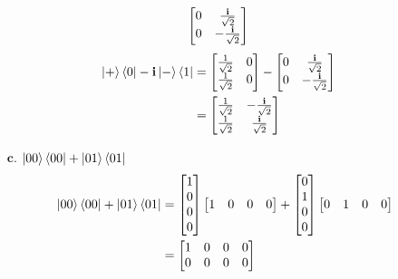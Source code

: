 \documentclass[11pt]{article}
\def\bfi{\ensuremath\textbf{i}}
\def\srtt{\ensuremath\frac{1}{\sqrt{2}}}
\begin{document}
\begin{enumerate}
\begin{align*}
\begin{bmatrix}
                    0 & \frac{\bfi}{\sqrt{2}} \\
                    0 & -\frac{\bfi}{\sqrt{2}} 
                \end{bmatrix}  & 
        \end{align*}
        \begin{align*}
            \ket{+}\bra{0} - \bfi\ket{-}\bra{1} 
            &= \begin{bmatrix} \srtt & 0 \\ \srtt & 0 \end{bmatrix}
                - \begin{bmatrix}
                    0 & \frac{\bfi}{\sqrt{2}} \\
                    0 & -\frac{\bfi}{\sqrt{2}} 
                \end{bmatrix} \\
                &= \begin{bmatrix}
                    \srtt & -\frac{\bfi}{\sqrt{2}} \\
                    \srtt & \frac{\bfi}{\sqrt{2}}
                \end{bmatrix} & 
        \end{align*}
    \item[$\textbf{c.}$] $\ket{00}\bra{00} + \ket{01}\bra{01}$
        \begin{align*}
        \ket{00}\bra{00} + \ket{01}\bra{01} 
            &= \begin{bmatrix}
                1 \\ 0 \\ 0 \\ 0
                \end{bmatrix}
                \begin{bmatrix}
                    1 & 0 & 0 & 0
                \end{bmatrix} + 
                \begin{bmatrix}
                    0 \\ 1 \\ 0 \\ 0
                \end{bmatrix}
                \begin{bmatrix}
                    0 & 1 & 0 & 0
                \end{bmatrix} \\
            &= \begin{bmatrix}
                1 & 0 & 0 & 0 \\
                0 & 0 & 0 & 0 \\

\end{bmatrix}
\end{align*}
\end{enumerate}
\end{document}
